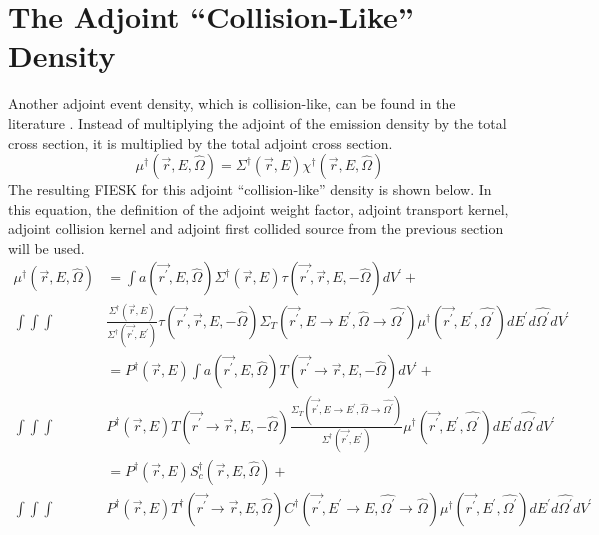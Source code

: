 \section{The Adjoint ``Collision-Like'' Density}
Another adjoint event density, which is collision-like, can be found in the 
literature \citep{kalos_monte_1968, eriksson_monte_1969}. Instead of 
multiplying the adjoint of the emission density by the total cross section, it 
is multiplied by the total adjoint cross section.
\begin{equation}
  \mu^{\dagger}(\vec{r},E,\hat{\Omega}) = \Sigma^{\dagger}(\vec{r},E)
  \chi^{\dagger}(\vec{r},E,\hat{\Omega})
  \label{eq:adj_collision_like_dens_to_adjoint_of_emission_dens}
\end{equation}
The resulting FIESK for this adjoint ``collision-like'' density is shown below.
In this equation, the definition of the adjoint weight factor, adjoint
transport kernel, adjoint collision kernel and adjoint first collided 
source from the previous section will be used.
\begin{align}
  \mu^{\dagger}(\vec{r},E,\hat{\Omega}) & = \int a(\vec{r^{'}},E,\hat{\Omega}) 
  \Sigma^{\dagger}(\vec{r},E) \tau(\vec{r^{'}},\vec{r},E,-\hat{\Omega}) 
  dV^{'} + \nonumber \\
  \int\int\int  & \frac{\Sigma^{\dagger}(\vec{r},E)}
                       {\Sigma^{\dagger}(\vec{r^{'}},E^{'})}
  \tau(\vec{r^{'}},\vec{r},E,-\hat{\Omega}) 
  \Sigma_T(\vec{r^{'}},E \to E^{'},\hat{\Omega} \to \hat{\Omega^{'}})
  \mu^{\dagger}(\vec{r^{'}},E^{'},\hat{\Omega^{'}}) dE^{'}d\hat{\Omega^{'}}dV^{'}
  \nonumber \\
  & = P^{\dagger}(\vec{r},E) \int
  a(\vec{r^{'}},E,\hat{\Omega}) 
  T(\vec{r^{'}} \to \vec{r},E,-\hat{\Omega}) dV^{'} + \nonumber \\
  \int\int\int &P^{\dagger}(\vec{r},E) 
  T(\vec{r^{'}} \to \vec{r},E,-\hat{\Omega})
  \frac{\Sigma_T(\vec{r^{'}},E \to E^{'},\hat{\Omega} \to \hat{\Omega^{'}})}
       {\Sigma^{\dagger}(\vec{r^{'}},E^{'})}
  \mu^{\dagger}(\vec{r^{'}},E^{'},\hat{\Omega^{'}}) dE^{'}d\hat{\Omega^{'}}dV^{'}
  \nonumber \\
  & = P^{\dagger}(\vec{r},E) 
  S_c^{\dagger}(\vec{r},E,\hat{\Omega}) + \nonumber \\
  \int\int\int &P^{\dagger}(\vec{r},E) 
  T^{\dagger}(\vec{r^{'}} \to \vec{r},E,\hat{\Omega})
  C^{\dagger}(\vec{r^{'}},E^{'} \to E,\hat{\Omega^{'}} \to \hat{\Omega})
  \mu^{\dagger}(\vec{r^{'}},E^{'},\hat{\Omega^{'}}) dE^{'}d\hat{\Omega^{'}}dV^{'}
  \nonumber 
\end{align}

